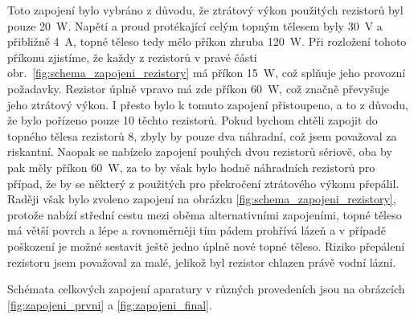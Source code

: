 \documentclass[12pt]{article}
\begin{document}
Toto zapojení bylo vybráno z důvodu, že ztrátový výkon použitých rezistorů byl pouze \SI{20}{\watt}. Napětí a proud protékající celým topným tělesem byly \SI{30}{\volt} a přibližně \SI{4}{\ampere}, topné těleso tedy mělo příkon zhruba \SI{120}{\watt}. Při rozložení tohoto příkonu zjistíme, že každy z rezistorů v pravé části obr.~\ref{fig:schema_zapojeni_rezistory} má příkon \SI{15}{\watt}, což splňuje jeho provozní požadavky. Rezistor úplně vpravo má zde příkon \SI{60}{\watt}, což značně převyšuje jeho ztrátový výkon. I přesto bylo k tomuto zapojení přistoupeno, a to z důvodu, že bylo pořízeno pouze 10 těchto rezistorů. Pokud bychom chtěli zapojit do topného tělesa rezistorů 8, zbyly by pouze dva náhradní, což jsem považoval za riskantní. Naopak se nabízelo zapojení pouhých dvou rezistorů sériově, oba by pak měly příkon \SI{60}{\watt}, za to by však bylo hodně náhradních rezistorů pro případ, že by se některý z použitých pro překročení ztrátového výkonu přepálil. Raději však bylo zvoleno zapojení na obrázku \ref{fig:schema_zapojeni_rezistory}, protože nabízí střední cestu mezi oběma alternativními zapojeními, topné těleso má větší povrch a lépe a rovnoměrněji tím pádem prohřívá lázeň a v případě poškození je možné sestavit ještě jedno úplně nové topné těleso. Riziko přepálení rezistoru jsem považoval za malé, jelikož byl rezistor chlazen právě vodní lázní.
\par\noindent
Schémata celkových zapojení aparatury v různých provedeních jsou na obrázcích \ref{fig:zapojeni_prvni} a \ref{fig:zapojeni_final}.

\newpage
\end{document}
